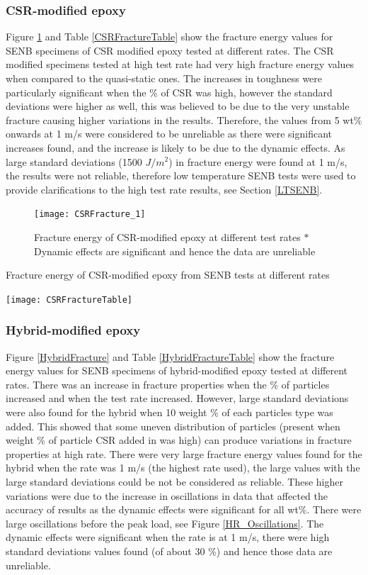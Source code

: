 \documentclass[numbers=noendperiod,chapterprefix=on]{icldt} %
\begin{document}
\subsubsection{CSR-modified epoxy}
Figure \ref{CSRFracture_1} and Table \ref{CSRFractureTable} show the fracture energy values for SENB specimens of CSR modified epoxy tested at different rates. The CSR modified specimens tested at high test rate had very high fracture energy values when compared to the quasi-static ones. The increases in toughness were particularly significant when the \% of CSR was high, however the standard deviations were higher as well, this was believed to be due to the very unstable fracture causing higher variations in the results. Therefore, the values from 5 wt\% onwards at 1 m/s were considered to be unreliable as there were significant increases found, and the increase is likely to be due to the dynamic effects. 
As large standard deviations (1500 $J/m^2$) in fracture energy were found at 1 m/s, the results were not reliable, therefore low temperature SENB tests were used to provide clarifications to the high test rate results, see Section \ref{LTSENB}.

\begin{figure}[!htpb]
\centering
\texttt{[image: CSRFracture\_1]}
\caption{Fracture energy of CSR-modified epoxy at different test rates \newline $\ast$ Dynamic effects are significant and hence the data are unreliable} \label{CSRFracture_1}
\end{figure}
\FloatBarrier

\begin{table}[!htpb]
\centering
\caption{Fracture energy of CSR-modified epoxy from SENB tests at different rates} \label{CSRFractureTable}
\texttt{[image: CSRFractureTable]}
\end{table}
\FloatBarrier

\subsubsection{Hybrid-modified epoxy}
Figure \ref{HybridFracture} and Table \ref{HybridFractureTable} show the fracture energy values for SENB specimens of hybrid-modified epoxy tested at different rates. There was an increase in fracture properties when the \% of particles increased and when the test rate increased. However, large standard deviations were also found for the hybrid when 10 weight \% of each particles type was added. This showed that some uneven distribution of particles (present when weight \% of particle CSR added in was high) can produce variations in fracture properties at high rate.  There were very large fracture energy values found for the hybrid when the rate was 1 m/s (the highest rate used), the large values with the large standard deviations could be not be considered as reliable. These higher variations were due to the increase in oscillations in data that affected the accuracy of results as the dynamic effects were significant for all wt\%. There were large oscillations before the peak load, see Figure \ref{HR_Oscillations}.  The dynamic effects were significant when the rate is at 1 m/s, there were high standard deviations values found (of about 30 \%)  and hence those data are unreliable.
\end{document}
